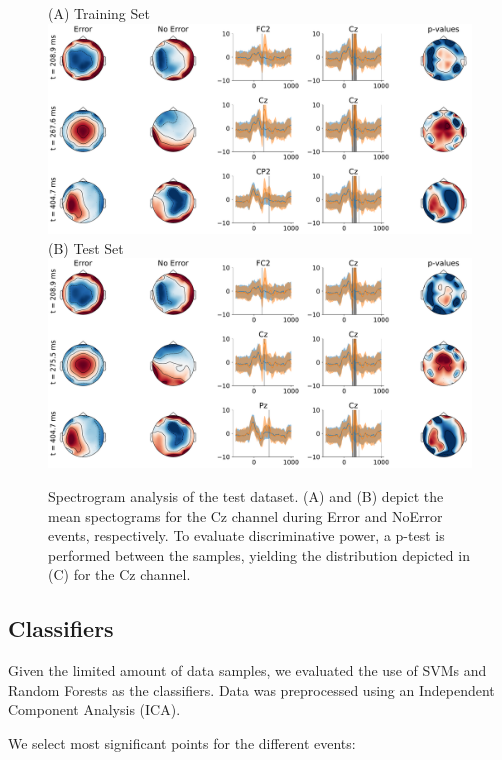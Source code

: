 \documentclass[10pt,a4paper]{article}
\begin{document}
\begin{figure}
    (A) Training Set\\
    \includegraphics[width=\textwidth]{fig/overview-train}
    \vspace{12pt}\\
    (B) Test Set\\
    \includegraphics[width=\textwidth]{fig/overview-test}
    \caption{Spectrogram analysis of the test dataset. (A) and (B) depict the mean spectograms for the Cz channel during Error and NoError events, respectively. To evaluate discriminative power, a p-test is performed between the samples, yielding the distribution depicted in (C) for the Cz channel.}
\end{figure}

\subsection{Classifiers}

Given the limited amount of data samples, we evaluated the use of SVMs and Random Forests as the classifiers.
Data was preprocessed using an Independent Component Analysis (ICA).

We select most significant points for the different events:
\end{document}
